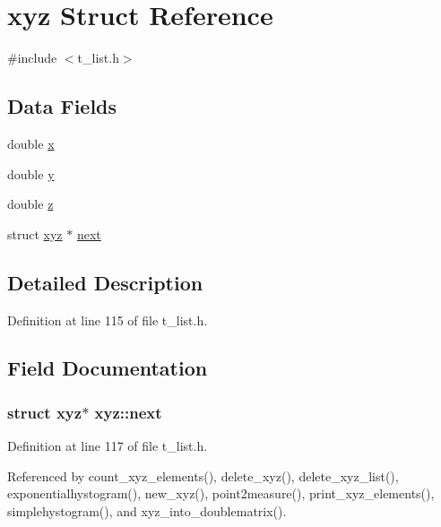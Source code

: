 \hypertarget{structxyz}{\section{xyz Struct Reference}
\label{structxyz}
}


{\ttfamily \#include $<$t\-\_\-list.\-h$>$}

\subsection*{Data Fields}
\begin{DoxyCompactItemize}
\item 
double \hyperlink{structxyz_a763cc12590d53e8ef7aacf1ffb3fa08d}{x}
\item 
double \hyperlink{structxyz_abda377700c50373014a4bf7de0f3e25a}{y}
\item 
double \hyperlink{structxyz_a198550434ad05e30c85a63be7612883c}{z}
\item 
struct \hyperlink{structxyz}{xyz} $\ast$ \hyperlink{structxyz_a83277cdeda7961102d345969224f52ea}{next}
\end{DoxyCompactItemize}


\subsection{Detailed Description}


Definition at line 115 of file t\-\_\-list.\-h.



\subsection{Field Documentation}
\hypertarget{structxyz_a83277cdeda7961102d345969224f52ea}{
\subsubsection[{next}]{\setlength{\rightskip}{0pt plus 5cm}struct {\bf xyz}$\ast$ xyz\-::next}}\label{structxyz_a83277cdeda7961102d345969224f52ea}


Definition at line 117 of file t\-\_\-list.\-h.



Referenced by count\-\_\-xyz\-\_\-elements(), delete\-\_\-xyz(), delete\-\_\-xyz\-\_\-list(), exponentialhystogram(), new\-\_\-xyz(), point2measure(), print\-\_\-xyz\-\_\-elements(), simplehystogram(), and xyz\-\_\-into\-\_\-doublematrix().

